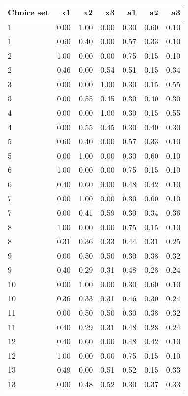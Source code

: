 \begin{table}[ht]
\centering
\begin{tabular}{lrrrrrr}
  \hline
Choice set & x1 & x2 & x3 & a1 & a2 & a3 \\ 
  \hline
1 & 0.00 & 1.00 & 0.00 & 0.30 & 0.60 & 0.10 \\ 
  1 & 0.60 & 0.40 & 0.00 & 0.57 & 0.33 & 0.10 \\ 
  2 & 1.00 & 0.00 & 0.00 & 0.75 & 0.15 & 0.10 \\ 
  2 & 0.46 & 0.00 & 0.54 & 0.51 & 0.15 & 0.34 \\ 
  3 & 0.00 & 0.00 & 1.00 & 0.30 & 0.15 & 0.55 \\ 
  3 & 0.00 & 0.55 & 0.45 & 0.30 & 0.40 & 0.30 \\ 
  4 & 0.00 & 0.00 & 1.00 & 0.30 & 0.15 & 0.55 \\ 
  4 & 0.00 & 0.55 & 0.45 & 0.30 & 0.40 & 0.30 \\ 
  5 & 0.60 & 0.40 & 0.00 & 0.57 & 0.33 & 0.10 \\ 
  5 & 0.00 & 1.00 & 0.00 & 0.30 & 0.60 & 0.10 \\ 
  6 & 1.00 & 0.00 & 0.00 & 0.75 & 0.15 & 0.10 \\ 
  6 & 0.40 & 0.60 & 0.00 & 0.48 & 0.42 & 0.10 \\ 
  7 & 0.00 & 1.00 & 0.00 & 0.30 & 0.60 & 0.10 \\ 
  7 & 0.00 & 0.41 & 0.59 & 0.30 & 0.34 & 0.36 \\ 
  8 & 1.00 & 0.00 & 0.00 & 0.75 & 0.15 & 0.10 \\ 
  8 & 0.31 & 0.36 & 0.33 & 0.44 & 0.31 & 0.25 \\ 
  9 & 0.00 & 0.50 & 0.50 & 0.30 & 0.38 & 0.32 \\ 
  9 & 0.40 & 0.29 & 0.31 & 0.48 & 0.28 & 0.24 \\ 
  10 & 0.00 & 1.00 & 0.00 & 0.30 & 0.60 & 0.10 \\ 
  10 & 0.36 & 0.33 & 0.31 & 0.46 & 0.30 & 0.24 \\ 
  11 & 0.00 & 0.50 & 0.50 & 0.30 & 0.38 & 0.32 \\ 
  11 & 0.40 & 0.29 & 0.31 & 0.48 & 0.28 & 0.24 \\ 
  12 & 0.40 & 0.60 & 0.00 & 0.48 & 0.42 & 0.10 \\ 
  12 & 1.00 & 0.00 & 0.00 & 0.75 & 0.15 & 0.10 \\ 
  13 & 0.49 & 0.00 & 0.51 & 0.52 & 0.15 & 0.33 \\ 
  13 & 0.00 & 0.48 & 0.52 & 0.30 & 0.37 & 0.33 \\ 

\end{tabular}
\end{table}
